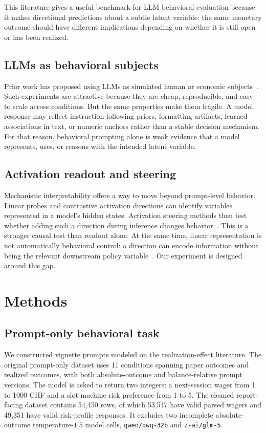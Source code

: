 \documentclass[final]{sparreport}
\begin{document}
This literature gives a useful benchmark for LLM behavioral evaluation because it makes directional predictions about a subtle latent variable: the same monetary outcome should have different implications depending on whether it is still open or has been realized.

\subsection{LLMs as behavioral subjects}

Prior work has proposed using LLMs as simulated human or economic subjects~\cite{aher2023simulate,horton2023simulated}. Such experiments are attractive because they are cheap, reproducible, and easy to scale across conditions. But the same properties make them fragile. A model response may reflect instruction-following priors, formatting artifacts, learned associations in text, or numeric anchors rather than a stable decision mechanism. For that reason, behavioral prompting alone is weak evidence that a model represents, uses, or reasons with the intended latent variable.

\subsection{Activation readout and steering}

Mechanistic interpretability offers a way to move beyond prompt-level behavior. Linear probes and contrastive activation directions can identify variables represented in a model's hidden states. Activation steering methods then test whether adding such a direction during inference changes behavior~\cite{turner2023activation,zou2023representation}. This is a stronger causal test than readout alone. At the same time, linear representation is not automatically behavioral control: a direction can encode information without being the relevant downstream policy variable~\cite{park2024linear}. Our experiment is designed around this gap.

\section{Methods}

\subsection{Prompt-only behavioral task}

We constructed vignette prompts modeled on the realization-effect literature. The original prompt-only dataset uses 11 conditions spanning paper outcomes and realized outcomes, with both absolute-outcome and balance-relative prompt versions. The model is asked to return two integers: a next-session wager from 1 to 1000 CHF and a slot-machine risk preference from 1 to 5. The cleaned report-facing dataset contains 54,450 rows, of which 53,547 have valid parsed wagers and 49,351 have valid risk-profile responses. It excludes two incomplete absolute-outcome temperature-\(1.5\) model cells, \texttt{qwen/qwq-32b} and \texttt{z-ai/glm-5}.
\end{document}
